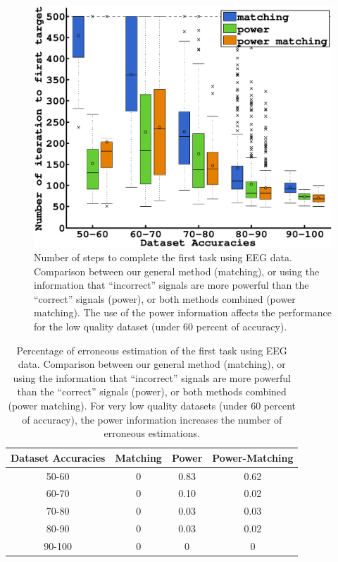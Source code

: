\begin{figure}[!htbp]
\centering
\includegraphics[width=\columnwidth]{figures/power/timefirst.eps}
\caption{Number of steps to complete the first task using EEG data. Comparison between our general method (matching), or using the information that ``incorrect'' signals are more powerful than the ``correct'' signals (power), or both methods combined (power matching). The use of the power information affects the performance for the low quality dataset (under 60 percent of accuracy).}
\label{fig:timefirst_powermatching}
\end{figure} 

\begin{table}
\centering
{}
\begin{tabular}{c c c c}
    Dataset Accuracies & Matching & Power & Power-Matching \\ \hline
    50-60 & 0 & 0.83 & 0.62 \\ 
    60-70 & 0 & 0.10 & 0.02 \\
    70-80 & 0 & 0.03 & 0.03 \\
    80-90 & 0 & 0.03 & 0.02 \\
    90-100 & 0 & 0 & 0 \\
\end{tabular}
\caption{Percentage of erroneous estimation of the first task using EEG data. Comparison between our general method (matching), or using the information that ``incorrect'' signals are more powerful than the ``correct'' signals (power), or both methods combined (power matching). For very low quality datasets (under 60 percent of accuracy), the power information increases the number of erroneous estimations.}
\label{tab:errorTaskRatio}
\end{table}

